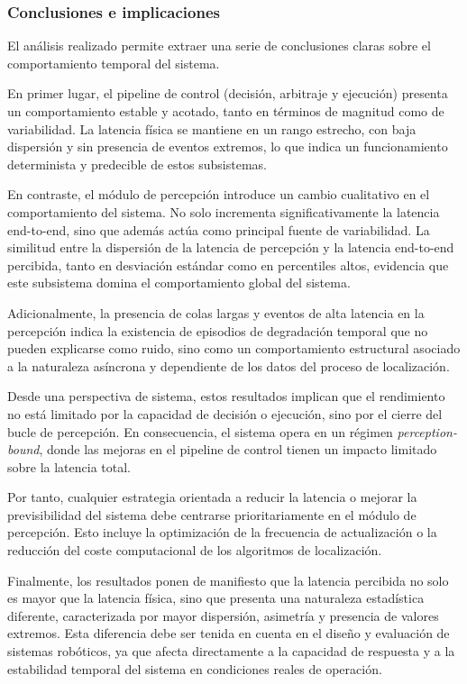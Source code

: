 \subsubsection{Conclusiones e implicaciones}

El análisis realizado permite extraer una serie de conclusiones claras sobre el comportamiento temporal del sistema.

En primer lugar, el pipeline de control (decisión, arbitraje y ejecución) presenta un comportamiento estable y acotado, tanto en términos de magnitud como de variabilidad. La latencia física se mantiene en un rango estrecho, con baja dispersión y sin presencia de eventos extremos, lo que indica un funcionamiento determinista y predecible de estos subsistemas.

En contraste, el módulo de percepción introduce un cambio cualitativo en el comportamiento del sistema. No solo incrementa significativamente la latencia end-to-end, sino que además actúa como principal fuente de variabilidad. La similitud entre la dispersión de la latencia de percepción y la latencia end-to-end percibida, tanto en desviación estándar como en percentiles altos, evidencia que este subsistema domina el comportamiento global del sistema.

Adicionalmente, la presencia de colas largas y eventos de alta latencia en la percepción indica la existencia de episodios de degradación temporal que no pueden explicarse como ruido, sino como un comportamiento estructural asociado a la naturaleza asíncrona y dependiente de los datos del proceso de localización.

Desde una perspectiva de sistema, estos resultados implican que el rendimiento no está limitado por la capacidad de decisión o ejecución, sino por el cierre del bucle de percepción. En consecuencia, el sistema opera en un régimen \textit{perception-bound}, donde las mejoras en el pipeline de control tienen un impacto limitado sobre la latencia total.

Por tanto, cualquier estrategia orientada a reducir la latencia o mejorar la previsibilidad del sistema debe centrarse prioritariamente en el módulo de percepción. Esto incluye la optimización de la frecuencia de actualización o la reducción del coste computacional de los algoritmos de localización.

Finalmente, los resultados ponen de manifiesto que la latencia percibida no solo es mayor que la latencia física, sino que presenta una naturaleza estadística diferente, caracterizada por mayor dispersión, asimetría y presencia de valores extremos. Esta diferencia debe ser tenida en cuenta en el diseño y evaluación de sistemas robóticos, ya que afecta directamente a la capacidad de respuesta y a la estabilidad temporal del sistema en condiciones reales de operación.
